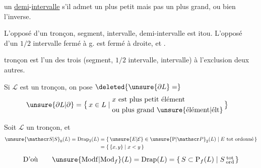 un \uline{demi}-\uline{intervalle} s'il admet un plus petit  mais pas un plus grand, ou bien l'inverse.

 L'opposé d'un tronçon, segment, intervalle, demi-intervalle est itou. L'opposé d'un $1/2$ intervalle fermé à g. est fermé à droite, et .

 tronçon est l'un des trois (segment, $1/2$ intervalle, intervalle) à l'exclusion  deux autres.

Si $\mathcal L$ est un tronçon, on pose $\deleted{\unsure{\partial L}=}$
\[
\begin{aligned}
\unsure{\partial L|\partial}&=\bigl\{\,x\in L\mid
\begin{aligned}&x\text{ est plus petit élément}\\
&\text{ou plus grand \unsure{élément|élt}}\end{aligned}\,\bigr\}
\end{aligned}
\]

Soit $\mathcal L$ un tronçon, et
\[
\begin{aligned}
\unsure{\mathscr S|S}_0(L)=\mathrm{Drap}_2(L)&=\{\,\unsure{E|\mathcal E}\in\unsure{\mathrm P|\mathscr P}_2(L)\mid E\text{ tot ordonné}\,\}\\
&=\{\,\{x,y\}\mid x<y\,\}
\end{aligned}
\]
\[
\text{D'où}\qquad \unsure{\mathrm{Modf}|\mathrm{Mod}_{f}}(L)=\mathrm{Drap}(L)
=\{\,S\subset\mathrm P_f(L)\mid S\,\substack{\text{tot}\\\text{ord}}\,\}
\]
